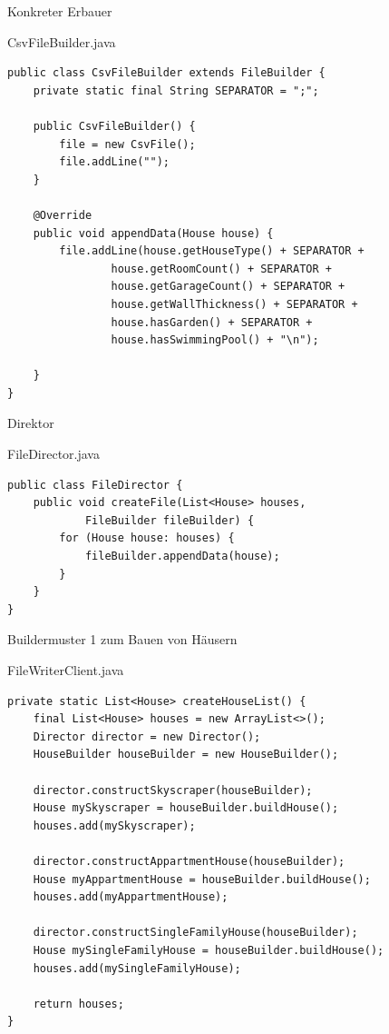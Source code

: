 \begin{frame}[fragile]{Konkreter Erbauer}
	\begin{exampleblock}{CsvFileBuilder.java}
 		\begin{lstlisting}
public class CsvFileBuilder extends FileBuilder {
	private static final String SEPARATOR = ";";
	
	public CsvFileBuilder() {
		file = new CsvFile();
		file.addLine("");
	}
	
	@Override
	public void appendData(House house) {
		file.addLine(house.getHouseType() + SEPARATOR +
				house.getRoomCount() + SEPARATOR + 
				house.getGarageCount() + SEPARATOR +
				house.getWallThickness() + SEPARATOR +
				house.hasGarden() + SEPARATOR +
				house.hasSwimmingPool() + "\n");
				
	}
}
        \end{lstlisting}
 	\end{exampleblock}
\end{frame}

\begin{frame}[fragile]{Direktor}
	\begin{exampleblock}{FileDirector.java}
 		\begin{lstlisting}
public class FileDirector {
	public void createFile(List<House> houses, 
			FileBuilder fileBuilder) {
		for (House house: houses) {
			fileBuilder.appendData(house);
		}
	}
}
 		\end{lstlisting}
 	\end{exampleblock}
\end{frame}

\begin{frame}[fragile]{Buildermuster 1 zum Bauen von Häusern}
	\begin{exampleblock}{FileWriterClient.java}
 		\begin{lstlisting}
private static List<House> createHouseList() {
    final List<House> houses = new ArrayList<>();
    Director director = new Director();
    HouseBuilder houseBuilder = new HouseBuilder();

    director.constructSkyscraper(houseBuilder);
    House mySkyscraper = houseBuilder.buildHouse();
    houses.add(mySkyscraper);
    
    director.constructAppartmentHouse(houseBuilder);
    House myAppartmentHouse = houseBuilder.buildHouse();
    houses.add(myAppartmentHouse);
    
    director.constructSingleFamilyHouse(houseBuilder);
    House mySingleFamilyHouse = houseBuilder.buildHouse();
    houses.add(mySingleFamilyHouse);
    
    return houses;
} 		    
 		\end{lstlisting}
 	\end{exampleblock}
\end{frame}

